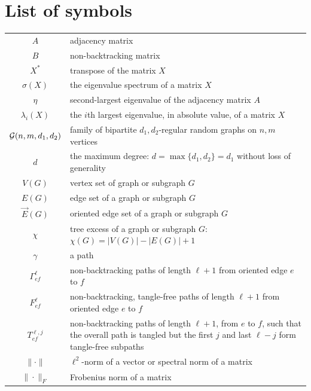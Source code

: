 \section{List of symbols}
\label{sec:list_of_symbols}

\begin{tabular}{cp{}}
$A$ & adjacency matrix\\
$B$ & non-backtracking matrix\\
$X^*$ & transpose of the matrix $X$\\
$\sigma(X)$ & the eigenvalue spectrum of a matrix $X$ \\
$\eta$ & second-largest eigenvalue of the adjacency matrix $A$\\
$\lambda_i (X)$ & the $i$th largest eigenvalue, in absolute value, of a matrix $X$\\ 
$\mathcal{G}(n,m,d_1,d_2)$ & family of bipartite $d_1,d_2$-regular random graphs on $n,m$ vertices \\
$d$ & the maximum degree: $d = \max \{d_1, d_2\} =d_1$ without loss of generality \\
$V(G)$ & vertex set of graph or subgraph $G$ \\
$E(G)$ & edge set of a graph or subgraph $G$ \\
$\vec{E}(G)$ & oriented edge set of a graph or subgraph $G$\\
$\chi$ & tree excess of a graph or subgraph $G$: 
$\chi(G) = |V(G)| - |E(G)| + 1$ \\
$\gamma$ & a path \\
$\Gamma_{ef}^\ell$ & non-backtracking paths of length $\ell+1$ from oriented edge $e$ to $f$\\
$F_{ef}^\ell$ & 
non-backtracking, tangle-free paths of length $\ell+1$ from oriented edge $e$ to $f$\\
$T_{ef}^{\ell,j}$ & non-backtracking paths of length $\ell+1$, from $e$ to $f$, such that
the overall path is tangled but the first $j$ and last $\ell - j$ form tangle-free subpaths \\
$\| \cdot \|$ & $\ell^2$-norm of a vector or spectral norm of a matrix \\
$\| \cdot \|_F$ & Frobenius norm of a matrix
\end{tabular}
